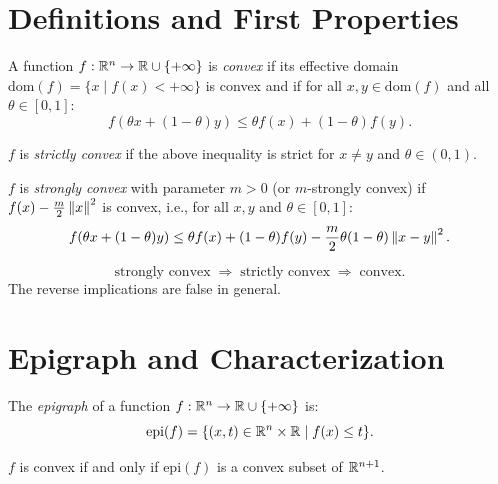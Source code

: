 \section{Definitions and First Properties}

\begin{definition}
A function $f : \mathbb{R}^n \to \mathbb{R} \cup \{+\infty\}$ is \emph{convex} if its effective
domain $\mathrm{dom}(f) = \{x \mid f(x) < +\infty\}$ is convex and if for all
$x, y \in \mathrm{dom}(f)$ and all $\theta \in [0,1]$:
\[
    f(\theta x + (1-\theta)y) \leq \theta f(x) + (1-\theta)f(y).
\]
\end{definition}

\begin{definition}
$f$ is \emph{strictly convex} if the above inequality is strict for $x \neq y$ and
$\theta \in (0,1)$.
\end{definition}

\begin{definition}
$f$ is \emph{strongly convex} with parameter $m > 0$ (or $m$-strongly convex) if
$f(x) - \frac{m}{2}\left\| x \right\|^2$ is convex, i.e., for all $x, y$ and $\theta \in [0,1]$:
\[
    f(\theta x + (1-\theta)y) \leq \theta f(x) + (1-\theta)f(y)
    - \frac{m}{2}\theta(1-\theta)\left\| x-y \right\|^2.
\]
\end{definition}

\begin{keyformulas}[title=\textbf{Convexity Hierarchy}]
\[
    \text{strongly convex} \;\Rightarrow\; \text{strictly convex}
    \;\Rightarrow\; \text{convex}.
\]
The reverse implications are false in general.
\end{keyformulas}

\section{Epigraph and Characterization}

\begin{definition}[Epigraph]
The \emph{epigraph} of a function $f : \mathbb{R}^n \to \mathbb{R} \cup \{+\infty\}$ is:
\[
    \mathrm{epi}(f) = \{(x, t) \in \mathbb{R}^n \times \mathbb{R} \mid f(x) \leq t\}.
\]
\end{definition}

\begin{theorem}
\label{thm:epigraph}
$f$ is convex if and only if $\mathrm{epi}(f)$ is a convex subset of $\mathbb{R}^{n+1}$.
\end{theorem}

